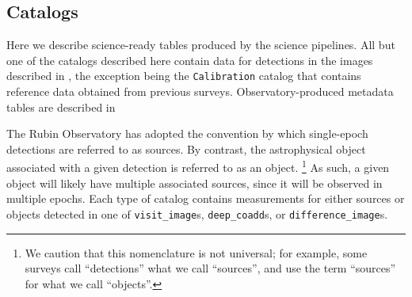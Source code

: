 \subsection{Catalogs}
\label{ssec:catalogs}
Here we describe science-ready tables produced by the science pipelines.
All but one of the catalogs described here contain data for detections in the images described in , the exception being the \texttt{Calibration} catalog that contains reference data obtained from previous surveys.
Observatory-produced \gls{metadata} tables are described in 


The Rubin Observatory has adopted the convention by which single-\gls{epoch} detections are referred to as sources.
By contrast, the astrophysical object associated with a given detection is referred to as an object.
\footnote{We caution that this nomenclature is not universal; for example, some surveys call ``detections'' what we call ``sources'', and use the term ``sources'' for what we call ``objects''.}
As such, a given object will likely have multiple associated sources, since it will be observed in multiple epochs.
Each type of catalog contains measurements for either sources or objects detected in one of \texttt{visit\_image}s, \texttt{deep\_coadd}s, or \texttt{difference\_image}s.



